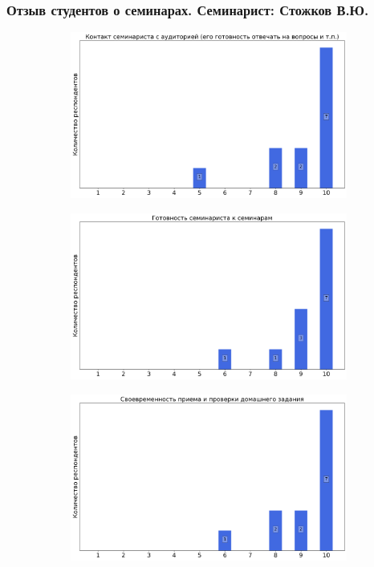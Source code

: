 	\subsubsection{Отзыв студентов о семинарах. Семинарист: Стожков В.Ю.}
		\begin{figure}[H]
			\centering
			\begin{subfigure}[b]{0.45\textwidth}
				\centering
				\includegraphics[width=\textwidth]{images/1 course/Общая физика - механика/seminarists-marks-Стожков В.Ю.-0.png}
			\end{subfigure}
			\begin{subfigure}[b]{0.45\textwidth}
				\centering
				\includegraphics[width=\textwidth]{images/1 course/Общая физика - механика/seminarists-marks-Стожков В.Ю.-1.png}
			\end{subfigure}
			\begin{subfigure}[b]{0.45\textwidth}
				\centering
				\includegraphics[width=\textwidth]{images/1 course/Общая физика - механика/seminarists-marks-Стожков В.Ю.-2.png}

\end{subfigure}
\end{figure}
